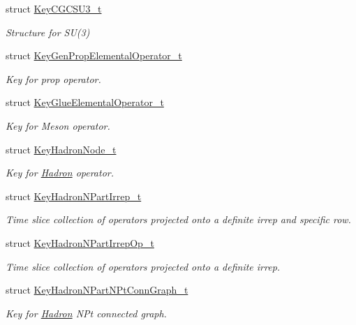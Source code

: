 \begin{DoxyCompactItemize}
struct \mbox{\hyperlink{structHadron_1_1KeyCGCSU3__t}{Key\+C\+G\+C\+S\+U3\+\_\+t}}
\begin{DoxyCompactList}\small\item\em Structure for S\+U(3) \end{DoxyCompactList}\item 
struct \mbox{\hyperlink{structHadron_1_1KeyGenPropElementalOperator__t}{Key\+Gen\+Prop\+Elemental\+Operator\+\_\+t}}
\begin{DoxyCompactList}\small\item\em Key for prop operator. \end{DoxyCompactList}\item 
struct \mbox{\hyperlink{structHadron_1_1KeyGlueElementalOperator__t}{Key\+Glue\+Elemental\+Operator\+\_\+t}}
\begin{DoxyCompactList}\small\item\em Key for Meson operator. \end{DoxyCompactList}\item 
struct \mbox{\hyperlink{structHadron_1_1KeyHadronNode__t}{Key\+Hadron\+Node\+\_\+t}}
\begin{DoxyCompactList}\small\item\em Key for \mbox{\hyperlink{namespaceHadron}{Hadron}} operator. \end{DoxyCompactList}\item 
struct \mbox{\hyperlink{structHadron_1_1KeyHadronNPartIrrep__t}{Key\+Hadron\+N\+Part\+Irrep\+\_\+t}}
\begin{DoxyCompactList}\small\item\em Time slice collection of operators projected onto a definite irrep and specific row. \end{DoxyCompactList}\item 
struct \mbox{\hyperlink{structHadron_1_1KeyHadronNPartIrrepOp__t}{Key\+Hadron\+N\+Part\+Irrep\+Op\+\_\+t}}
\begin{DoxyCompactList}\small\item\em Time slice collection of operators projected onto a definite irrep. \end{DoxyCompactList}\item 
struct \mbox{\hyperlink{structHadron_1_1KeyHadronNPartNPtConnGraph__t}{Key\+Hadron\+N\+Part\+N\+Pt\+Conn\+Graph\+\_\+t}}
\begin{DoxyCompactList}\small\item\em Key for \mbox{\hyperlink{namespaceHadron}{Hadron}} N\+Pt connected graph. \end{DoxyCompactList}\item 

\end{DoxyCompactItemize}
